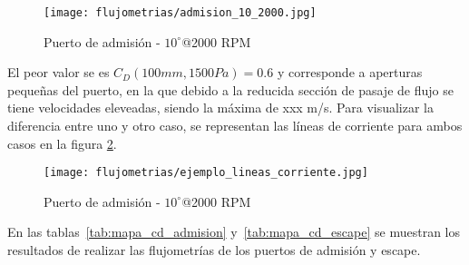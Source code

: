 \begin{figure}
    \centering
    \texttt{[image: flujometrias/admision\_10\_2000.jpg]}
    \caption{Puerto de admisión - $10^{\circ}$@2000 RPM}\label{fig:admision_10_2000.jpg}
\end{figure}

El peor valor se es $C_{D}(100mm, 1500Pa) = 0.6$ y corresponde a aperturas
pequeñas del puerto, en la que debido a la reducida sección de pasaje de flujo
se tiene velocidades eleveadas, siendo la máxima de xxx m/s.
%
Para visualizar la diferencia entre uno y otro caso, se representan las líneas
de corriente para ambos casos en la figura \ref{fig:admision_10_2000.jpg}.

\begin{figure}
    \centering
    \texttt{[image: flujometrias/ejemplo\_lineas\_corriente.jpg]}
    \caption{Puerto de admisión - $10^{\circ}$@2000 RPM}\label{fig:admision_10_2000.jpg}
\end{figure}

En las tablas~\ref{tab:mapa_cd_admision} y~\ref{tab:mapa_cd_escape} se muestran los
resultados de realizar las flujometrías de los puertos de admisión y escape.


